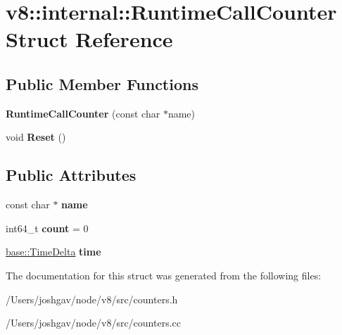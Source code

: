 \hypertarget{structv8_1_1internal_1_1_runtime_call_counter}{}\section{v8\+:\+:internal\+:\+:Runtime\+Call\+Counter Struct Reference}
\label{structv8_1_1internal_1_1_runtime_call_counter}
\subsection*{Public Member Functions}
\begin{DoxyCompactItemize}
\item 
{\bfseries Runtime\+Call\+Counter} (const char $\ast$name)\hypertarget{structv8_1_1internal_1_1_runtime_call_counter_ae6fd918d026a8906f964a0c35c000634}{}\label{structv8_1_1internal_1_1_runtime_call_counter_ae6fd918d026a8906f964a0c35c000634}

\item 
void {\bfseries Reset} ()\hypertarget{structv8_1_1internal_1_1_runtime_call_counter_aaf750c3b15af87b2af841f75dbaa46c9}{}\label{structv8_1_1internal_1_1_runtime_call_counter_aaf750c3b15af87b2af841f75dbaa46c9}

\end{DoxyCompactItemize}
\subsection*{Public Attributes}
\begin{DoxyCompactItemize}
\item 
const char $\ast$ {\bfseries name}\hypertarget{structv8_1_1internal_1_1_runtime_call_counter_a19e399bce7a06057e6ad4ccab6fe8210}{}\label{structv8_1_1internal_1_1_runtime_call_counter_a19e399bce7a06057e6ad4ccab6fe8210}

\item 
int64\+\_\+t {\bfseries count} = 0\hypertarget{structv8_1_1internal_1_1_runtime_call_counter_a3b82a7e6e791825a6c0aa21681f23b43}{}\label{structv8_1_1internal_1_1_runtime_call_counter_a3b82a7e6e791825a6c0aa21681f23b43}

\item 
\hyperlink{classv8_1_1base_1_1_time_delta}{base\+::\+Time\+Delta} {\bfseries time}\hypertarget{structv8_1_1internal_1_1_runtime_call_counter_a5bca4eac82ad35a8171dd0b215770cae}{}\label{structv8_1_1internal_1_1_runtime_call_counter_a5bca4eac82ad35a8171dd0b215770cae}

\end{DoxyCompactItemize}


The documentation for this struct was generated from the following files\+:\begin{DoxyCompactItemize}
\item 
/\+Users/joshgav/node/v8/src/counters.\+h\item 
/\+Users/joshgav/node/v8/src/counters.\+cc\end{DoxyCompactItemize}

